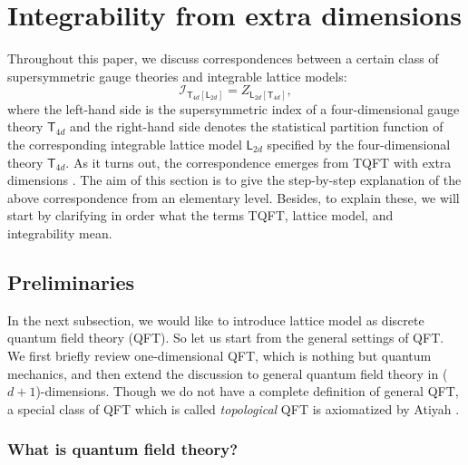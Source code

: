 \begin{comment}
\documentclass[11pt]{article}  %
\usepackage{Common/toshi}

\end{comment}


\section{Integrability from extra dimensions}


Throughout this paper, we discuss correspondences between
a certain class of supersymmetric gauge theories and integrable lattice
models:
\begin{equation}
 \mathcal{I}_{\mathsf{T}_{4d}\left[\mathsf{L}_{2d}\right]}
	=  Z_{\mathsf{L}_{2d}\left[\mathsf{T}_{4d}\right]},
\end{equation}
where the left-hand side is the supersymmetric index of a four-dimensional
gauge theory $\mathsf{T}_{4d}$ and the right-hand side denotes the
statistical partition function of the corresponding integrable lattice
model $\mathsf{L}_{2d}$ specified by the four-dimensional theory
$\mathsf{T}_{4d}$. As it turns out, the correspondence emerges from
TQFT with extra dimensions \cite{Yagi:2015lha}. The aim of this section is
to give the step-by-step explanation of the above correspondence from
an elementary level. Besides, to explain these, we will start by clarifying
in order what the terms TQFT, lattice model, and integrability mean.





\subsection{Preliminaries}

In the next subsection, we would like to introduce lattice model as
discrete quantum field theory (QFT). So let us start from the general
settings of QFT. We first briefly review one-dimensional QFT, which
is nothing but quantum mechanics, and then extend the discussion to
general quantum field theory in ($d+1$)-dimensions. Though we do
not have a complete definition of general QFT, a special class of
QFT which is called \emph{topological} QFT is axiomatized by Atiyah
\cite{Atiyah:1989vu}.





\subsubsection{What is quantum field theory?}

